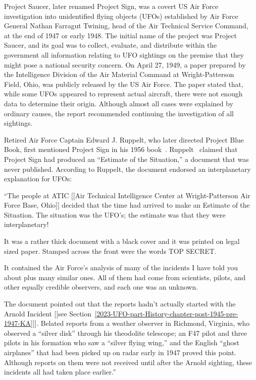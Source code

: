 Project Saucer, later renamed Project Sign, was a covert US Air Force investigation into unidentified flying objects (UFOs)
established by Air Force General Nathan Farragut Twining, head of the Air Technical Service Command,
at the end of 1947 or early 1948. The initial name of the project was Project Saucer, and its goal was to collect, evaluate, and distribute within the government all information relating to UFO sightings on the premise that they might pose a national security concern. On April 27, 1949, a paper prepared by the Intelligence Division of the Air Material Command at Wright-Patterson Field, Ohio, was publicly released by the US Air Force. The paper stated that, while some UFOs appeared to represent actual aircraft, there were not enough data to determine their origin. Although almost all cases were explained by ordinary causes, the report recommended continuing the investigation of all sightings.

Retired Air Force Captain Edward J. Ruppelt, who later directed Project Blue Book, first mentioned Project Sign in his 1956 book~\cite{Ruppelt2011May}. Ruppelt~\cite[Chapter~3]{Ruppelt2011May} claimed that Project Sign had produced an ``Estimate of the Situation,'' a document that was never published. According to Ruppelt, the document endorsed an interplanetary explanation for UFOs:
\begin{svgraybox}
``The people at ATIC [[Air Technical Intelligence Center at Wright-Patterson Air Force Base, Ohio]]
decided that the time had arrived to make an Estimate of the Situation.
The situation was the UFO's; the estimate was that they were interplanetary!

It was a rather thick document with a black cover and it was printed on legal sized paper. Stamped across the front were the words TOP SECRET.

It contained the Air Force's analysis  of many  of
the incidents I have told you about plus many similar ones.
All of them had come from scientists, pilots, and other equally credible observers, and each one was an unknown.


      The document pointed out that the reports hadn't actually started with the Arnold Incident
[[see Section~\ref{2023-UFO-part-History-chapter-post-1945-pre-1947-KA}]].
Belated reports from a weather observer in Richmond, Virginia, who observed a
``silver disk'' through his theodolite telescope; an F47 pilot and three pilots in his formation who saw a ``silver flying wing,''
and the English ``ghost airplanes'' that had been picked up on radar early in 1947 proved this point.
Although reports on them were not received until after the
Arnold sighting, these incidents all had taken place earlier.''
\end{svgraybox}

